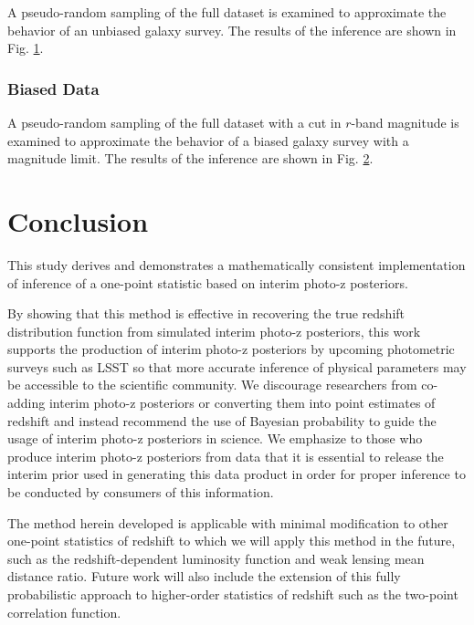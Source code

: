 \documentclass[preprint]{aastex}
\begin{document}
A pseudo-random sampling of the full dataset is examined to approximate the 
behavior of an unbiased galaxy survey.  The results of the inference are shown 
in Fig. \ref{fig:dataparam}.

\begin{figure}
\caption{}
\label{fig:dataparam}
\end{figure}

\subsubsection{Biased Data}
\label{sec:biased}

A pseudo-random sampling of the full dataset with a cut in $r$-band magnitude 
is examined to approximate the behavior of a biased galaxy survey with a 
magnitude limit.  The results of the inference are shown in Fig. 
\ref{fig:biasparam}.

\begin{figure}
\caption{}
\label{fig:biasparam}
\end{figure}

\clearpage
\section{Conclusion}
\label{sec:con}

This study derives and demonstrates a mathematically consistent implementation 
of inference of a one-point statistic based on interim photo-z posteriors.  

By showing that this method is effective in recovering the true redshift 
distribution function from simulated interim photo-z posteriors, this work 
supports the production of interim photo-z posteriors by upcoming photometric 
surveys such as LSST so that more accurate inference of physical parameters may 
be accessible to the scientific community.  We discourage researchers from 
co-adding interim photo-z posteriors or converting them into point estimates of 
redshift and instead recommend the use of Bayesian probability to guide the 
usage of interim photo-z posteriors in science.  We emphasize to those who 
produce interim photo-z posteriors from data that it is essential to release 
the interim prior used in generating this data product in order for proper 
inference to be conducted by consumers of this information.

The method herein developed is applicable with minimal modification to other 
one-point statistics of redshift to which we will apply this method in the 
future, such as the redshift-dependent luminosity function and weak lensing 
mean distance ratio.  Future work will also include the extension of this fully 
probabilistic approach to higher-order statistics of redshift such as the 
two-point correlation function.
\end{document}
